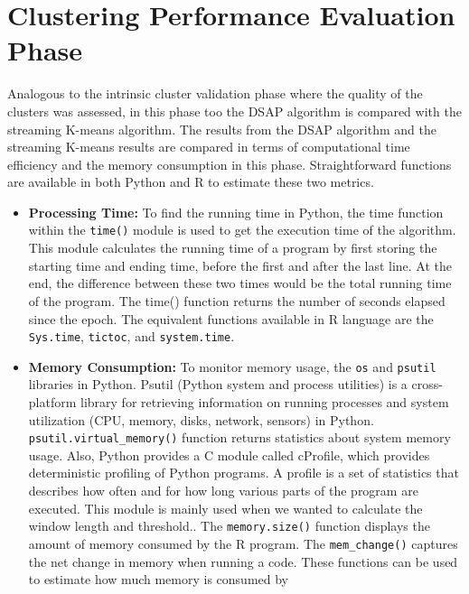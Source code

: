 \section{Clustering Performance Evaluation Phase}
Analogous to the intrinsic cluster validation phase where the quality of the clusters was assessed, in this phase too the DSAP algorithm is compared with the streaming K-means algorithm. The results from the DSAP algorithm and the streaming K-means results are compared in terms of computational time efficiency and the memory consumption in this phase. Straightforward functions are available in both Python and R to estimate these two metrics. 
\begin{itemize}
    \item \textbf{Processing Time:} To find the running time in Python, the time function within the \texttt{time()} module is used to get the execution time of the algorithm. This module calculates the running time of a program by first storing the starting time and ending time, before the first and after the last line. At the end, the difference between these two times would be the total running time of the program. The time() function returns the number of seconds elapsed since the epoch. The equivalent functions available in R language are the \texttt{Sys.time}, \texttt{tictoc}, and \texttt{system.time}.

    \item \textbf{Memory Consumption:} To monitor memory usage, the \texttt{os} and \texttt{psutil} libraries in Python. Psutil (Python system and process utilities) is a cross-platform library for retrieving information on running processes and system utilization (CPU, memory, disks, network, sensors) in Python. \texttt{psutil.virtual\_memory()} function returns statistics about system memory usage. Also, Python provides a C module called cProfile, which provides deterministic profiling of Python programs. A profile is a set of statistics that describes how often and for how long various parts of the program are executed. This module is mainly used when we wanted to calculate the window length and threshold.. The \texttt{memory.size()} function displays the amount of memory consumed by the R program. The \texttt{mem\_change()} captures the net change in memory when running a code. These functions can be used to estimate how much memory is consumed by  



\end{itemize}



